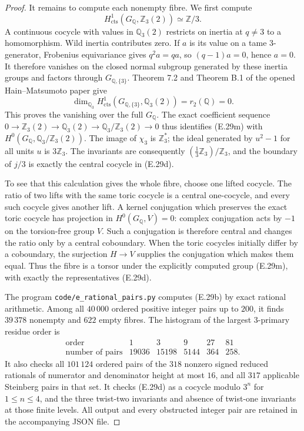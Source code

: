 \begin{proof}
It remains to compute each nonempty fibre. We first compute
\[
 H^1_{\mathrm{cts}}(G_{\mathbb Q},\mathbb Z_3(2))
      \simeq\mathbb Z/3.                                     \tag{E.29m}
\]
A continuous cocycle with values in $\mathbb Q_3(2)$
restricts on inertia at $q\ne3$ to a homomorphism.
Wild inertia contributes zero. If $a$ is its value on a
tame $3$-generator, Frobenius equivariance gives
$q^2a=qa$, so $(q-1)a=0$, hence $a=0$.
It therefore vanishes on the closed normal subgroup
generated by these inertia groups and factors through
$G_{\mathbb Q,\{3\}}$.
Theorem 7.2 and Theorem B.1 of the opened
Hain--Matsumoto paper \cite{E_HainMatsumoto} give
\[
 \dim_{\mathbb Q_3}H^1_{\mathrm{cts}}
     (G_{\mathbb Q,\{3\}},\mathbb Q_3(2))=r_2(\mathbb Q)=0.
\]
This proves the vanishing over the full $G_{\mathbb Q}$.
The exact coefficient sequence
$0\to\mathbb Z_3(2)\to\mathbb Q_3(2)
\to\mathbb Q_3/\mathbb Z_3(2)\to0$ thus identifies (E.29m)
with $H^0(G_{\mathbb Q},\mathbb Q_3/\mathbb Z_3(2))$.
The image of $\chi_3$ is $\mathbb Z_3^*$; the ideal generated
by $u^2-1$ for all units $u$ is $3\mathbb Z_3$.
The invariants are consequently
$(\tfrac13\mathbb Z_3)/\mathbb Z_3$, and the boundary of
$j/3$ is exactly the central cocycle in (E.29d).

To see that this calculation gives the whole fibre, choose
one lifted cocycle. The ratio of two lifts with the same
toric cocycle is a central one-cocycle, and every such
cocycle gives another lift. A kernel conjugation which
preserves the exact toric cocycle has projection in
$H^0(G_{\mathbb Q},V)=0$: complex conjugation acts by
$-1$ on the torsion-free group $V$. Such a conjugation
is therefore central and changes the ratio only by a
central coboundary. When the toric cocycles initially
differ by a coboundary, the surjection $H\to V$ supplies
the conjugation which makes them equal. Thus the fibre
is a torsor under the explicitly computed group (E.29m),
with exactly the representatives (E.29d).

The program \texttt{code/e\_rational\_pairs.py} computes
(E.29b) by exact rational arithmetic. Among all $40\,000$
ordered positive integer pairs up to $200$, it finds
$39\,378$ nonempty and $622$ empty fibres. The histogram
of the largest $3$-primary residue order is
\[
\begin{array}{c|rrrrr}
 \text{order}&1&3&9&27&81\\\hline
 \text{number of pairs}&19036&15198&5144&364&258.
\end{array}
\]
It also checks all $101\,124$ ordered pairs of the $318$
nonzero signed reduced rationals of numerator and
denominator height at most $16$, and all $317$ applicable
Steinberg pairs in that set. It checks (E.29d) as a
cocycle modulo $3^n$ for $1\le n\le4$, and the three
twist-two invariants and absence of twist-one invariants
at those finite levels. All output and every obstructed
integer pair are retained in the accompanying JSON file.
\end{proof}
